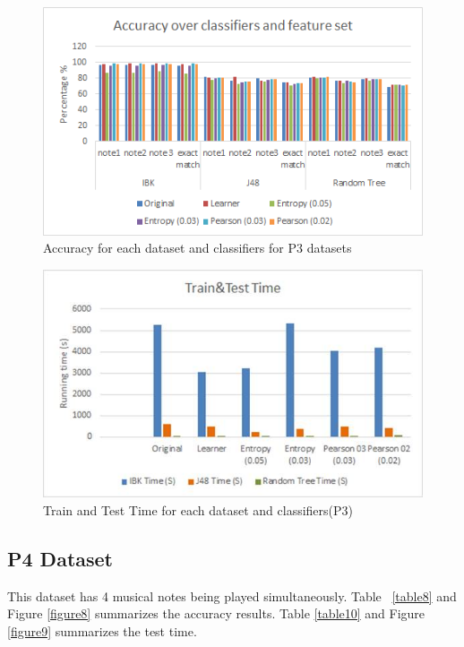 \documentclass{article}
\begin{document}
\begin{figure}[h]
\includegraphics[scale=.65]{accuracy_p3}
 \caption{Accuracy for each dataset and classifiers for P3 datasets}
\label{figure6}
\end{figure}
\begin{figure}[h]
\includegraphics[scale=.50]{time_p3}
 \caption{Train and Test Time for each dataset and classifiers(P3)}
\label{figure7}
\end{figure}


\subsection{P4 Dataset}
This dataset has 4 musical notes being played simultaneously. Table ~\ref{table8} and Figure \ref{figure8} summarizes the accuracy results. Table \ref{table10} and Figure \ref{figure9} summarizes the test time.

\end{document}

